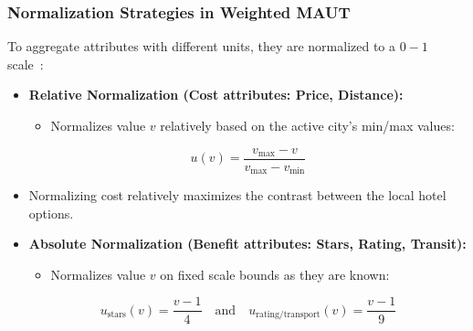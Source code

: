 \begin{frame}
    \frametitle{Normalization Strategies in Weighted MAUT}
    To aggregate attributes with different units, they are normalized to a $0-1$ scale~\cite{keeney1993decisions}:
    \begin{itemize}
        \item \textbf{Relative Normalization (Cost attributes: Price, Distance):}
            \begin{itemize}
                \item Normalizes value $v$ relatively based on the active city's min/max values:
            \end{itemize}
            \begin{equation*}
              u(v) = \frac{v_{\max} - v}{v_{\max} - v_{\min}}
            \end{equation*}
            \item Normalizing cost relatively maximizes the contrast between the local hotel options.
        \item \textbf{Absolute Normalization (Benefit attributes: Stars, Rating, Transit):}
            \begin{itemize}
                \item Normalizes value $v$ on fixed scale bounds as they are known:
            \end{itemize}
            \begin{equation*}
              u_{\text{stars}}(v) = \frac{v - 1}{4} \quad \text{and} \quad u_{\text{rating/transport}}(v) = \frac{v - 1}{9}
            \end{equation*}
    \end{itemize}
\end{frame}

